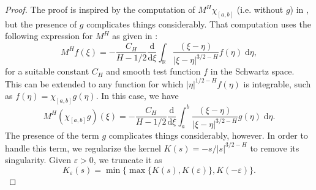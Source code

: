 \documentclass[reqno,12pt]{amsart}
\theoremstyle{plain}%
\theoremstyle{definition}
\begin{document}
\begin{proof}
    The proof is inspired by the computation of $M^H\chi_{[a, b]}$ (i.e. without $g$) in \cite[Example 4.1.4]{BHOB2008}, but the presence of $g$ complicates things considerably. That computation uses the following expression for $M^H$ as given in \cite[eq. (4.2)]{BHOB2008}:
    \[
        M^H f(\xi) = - \frac{C_H}{H-1/2}\frac{\mathrm{d}}{\mathrm{d}\xi} \int_\mathbb{R} \frac{(\xi - \eta)}{|\xi - \eta|^{3/2-H}} f(\eta) \;\mathrm{d}\eta,
    \]
    for a suitable constant $C_H$ and smooth test function $f$ in the Schwartz space. This can be extended to any function for which $|\eta|^{1/2 - H}f(\eta)$ is integrable, such as $f(\eta) = \chi_{[a, b]}g(\eta)$. In this case, we have
    \[
        M^H (\chi_{[a, b]}g)(\xi) = - \frac{C_H}{H-1/2}\frac{\mathrm{d}}{\mathrm{d}\xi} \int_a^b \frac{(\xi - \eta)}{|\xi - \eta|^{3/2-H}} g(\eta) \;\mathrm{d}\eta.
    \]
    The presence of the term $g$ complicates things considerably, however. In order to handle this term, we regularize the kernel $K(s) = - s/|s|^{3/2-H}$ to remove its singularity. Given $\varepsilon > 0$, we truncate it as
    \[
        K_\varepsilon(s) = \min\{\max\{K(s), K(\varepsilon)\}, K(-\varepsilon)\}.
    \]
    

\end{proof}
\end{document}
